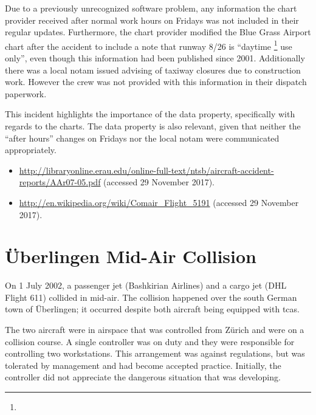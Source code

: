 Due to a previously unrecognized software problem, any \gls{information} the chart provider received after normal work hours on Fridays was not included in their regular updates. Furthermore, the chart provider modified the Blue Grass Airport chart after the accident to include a note that runway 8/26 is ``daytime \footnote{} use only'', even though this \gls{information} had been published since 2001. Additionally there was a local \gls{notam} issued advising of taxiway closures due to construction work. However the crew was not provided with this \gls{information} in their dispatch paperwork.

This incident highlights the importance of the  \gls{data property}, specifically with regards to the charts. The  \gls{data property} is also relevant, given that neither the ``after hours'' changes on Fridays nor the local \gls{notam} were communicated appropriately.

\begin{samepage}
\begin{itemize}
  \item \raggedright{\href{http://libraryonline.erau.edu/online-full-text/ntsb/aircraft-accident-reports/AAr07-05.pdf}{http://libraryonline.erau.edu/online-full-text/ntsb/aircraft-accident-reports/AAr07-05.pdf} (accessed 29 November 2017).}
	\item \raggedright{\href{http://en.wikipedia.org/wiki/Comair_Flight_5191}{http://en.wikipedia.org/wiki/Comair\_Flight\_5191} (accessed 29 November 2017).}
\end{itemize}
\end{samepage}


\section{\"Uberlingen Mid-Air Collision} \label{bkm:incacc:uberlingen}
On 1 July 2002, a passenger jet (Bashkirian Airlines) and a cargo jet (DHL Flight 611) collided in mid-air. The collision happened over the south German town of \"Uberlingen; it occurred despite both aircraft being equipped with \gls{tcas}.

The two aircraft were in airspace that was controlled from Z\"urich and were on a collision course. A single controller was on duty and they were responsible for controlling two workstations. This arrangement was against regulations, but was tolerated by management and had become accepted practice. Initially, the controller did not appreciate the dangerous situation that was developing.

